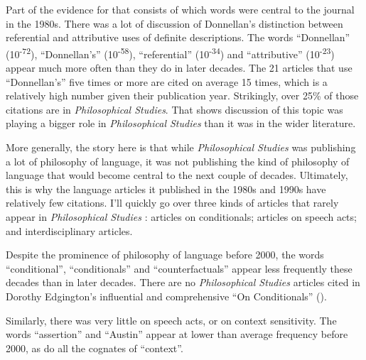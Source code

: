 \documentclass[
  11pt,
  letterpaper,
  DIV=11,
  numbers=noendperiod,
  twoside]{scrartcl}
\begin{document}
Part of the evidence for that consists of which words were central to
the journal in the 1980s. There was a lot of discussion of Donnellan's
distinction between referential and attributive uses of definite
descriptions. The words ``Donnellan'' (10\textsuperscript{-72}),
``Donnellan's'' (10\textsuperscript{-58}), ``referential''
(10\textsuperscript{-34}) and ``attributive'' (10\textsuperscript{-23})
appear much more often than they do in later decades. The 21 articles
that use ``Donnellan's'' five times or more are cited on average 15
times, which is a relatively high number given their publication year.
Strikingly, over 25\% of those citations are in \emph{Philosophical
Studies}. That shows discussion of this topic was playing a bigger role
in \emph{Philosophical Studies} than it was in the wider literature.

More generally, the story here is that while \emph{Philosophical
Studies} was publishing a lot of philosophy of language, it was not
publishing the kind of philosophy of language that would become central
to the next couple of decades. Ultimately, this is why the language
articles it published in the 1980s and 1990s have relatively few
citations. I'll quickly go over three kinds of articles that rarely
appear in \emph{Philosophical Studies} : articles on conditionals;
articles on speech acts; and interdisciplinary articles.

Despite the prominence of philosophy of language before 2000, the words
``conditional'', ``conditionals'' and ``counterfactuals'' appear less
frequently these decades than in later decades. There are no
\emph{Philosophical Studies} articles cited in Dorothy Edgington's
influential and comprehensive ``On Conditionals''
().

Similarly, there was very little on speech acts, or on context
sensitivity. The words ``assertion'' and ``Austin'' appear at lower than
average frequency before 2000, as do all the cognates of ``context''.
\end{document}
